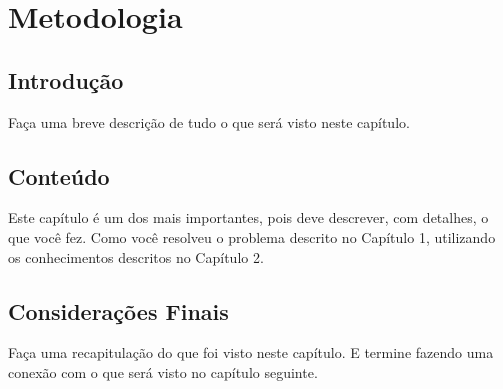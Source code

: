 \chapter{Metodologia}
\label{ch:metodologia}

\section{Introdução}
Faça uma breve descrição de tudo o que será visto neste capítulo.

\section{Conteúdo}
Este capítulo é um dos mais importantes, pois deve descrever, com detalhes, o que você fez. Como você resolveu o problema descrito no Capítulo 1, utilizando os conhecimentos descritos no Capítulo 2.

\section{Considerações Finais}
Faça uma recapitulação do que foi visto neste capítulo. E termine fazendo uma conexão com o que será visto no capítulo seguinte.
